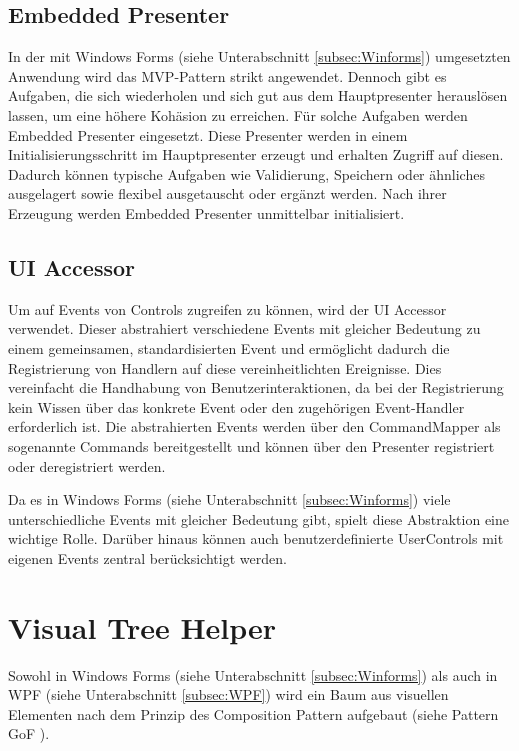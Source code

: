 \subsection{Embedded Presenter}
\label{subsec:embedded_presenter}
In der mit Windows Forms (siehe Unterabschnitt \ref{subsec:Winforms}) umgesetzten Anwendung wird das MVP-Pattern strikt angewendet. Dennoch gibt es Aufgaben, die sich wiederholen und sich gut aus dem Hauptpresenter herauslösen lassen, um eine höhere Kohäsion zu erreichen. Für solche Aufgaben werden Embedded Presenter eingesetzt. Diese Presenter werden in einem Initialisierungsschritt im Hauptpresenter erzeugt und erhalten Zugriff auf diesen. Dadurch können typische Aufgaben wie Validierung, Speichern oder ähnliches ausgelagert sowie flexibel ausgetauscht oder ergänzt werden. Nach ihrer Erzeugung werden Embedded Presenter unmittelbar initialisiert.

\subsection{UI Accessor}

Um auf Events von Controls zugreifen zu können, wird der UI Accessor verwendet. Dieser abstrahiert verschiedene Events mit gleicher Bedeutung zu einem gemeinsamen, standardisierten Event und ermöglicht dadurch die Registrierung von Handlern auf diese vereinheitlichten Ereignisse. Dies vereinfacht die Handhabung von Benutzerinteraktionen, da bei der Registrierung kein Wissen über das konkrete Event oder den zugehörigen Event-Handler erforderlich ist. Die abstrahierten Events werden über den CommandMapper als sogenannte Commands bereitgestellt und können über den Presenter registriert oder deregistriert werden.

Da es in Windows Forms (siehe Unterabschnitt \ref{subsec:Winforms}) viele unterschiedliche Events mit gleicher Bedeutung gibt, spielt diese Abstraktion eine wichtige Rolle. Darüber hinaus können auch benutzerdefinierte UserControls mit eigenen Events zentral berücksichtigt werden.

\section{Visual Tree Helper}
\label{sec:visual_tree_helper}
Sowohl in Windows Forms (siehe Unterabschnitt \ref{subsec:Winforms}) als auch in WPF (siehe Unterabschnitt \ref{subsec:WPF}) wird ein Baum aus visuellen Elementen nach dem Prinzip des Composition Pattern aufgebaut (siehe Pattern GoF \cite{gamma1995design}).


